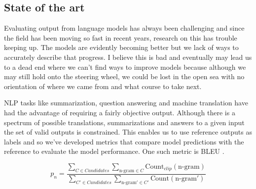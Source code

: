 \subsection{State of the art} \label{sec:body_state_of_the_art}
Evaluating output from language models has always been challenging and since the field has been moving so fast in recent years, research on this has trouble keeping up. The models are evidently becoming better but we lack of ways to accurately describe that progress. I believe this is bad and eventually may lead us to a dead end where we can't find ways to improve models because although we may still hold onto the steering wheel, we could be lost in the open sea with no orientation of where we came from and what course to take next. 

NLP tasks like summarization, question answering and machine translation have had the advantage of requiring a fairly objective output. Although there is a spectrum of possible translations, summarizations and answers to a given input the set of valid outputs is constrained. This enables us to use reference outputs as labels and so we've developed metrics that compare model predictions with the reference to evaluate the model performance. One such metric is BLEU \cite{papineni2002bleu}.  

\begin{equation}
p_n = \frac{\sum_{C \in Candidates} \sum_{\text{n-gram} \in C}\text{Count}_{clip}(\text{n-gram})}{\sum_{C' \in Candidates} \sum_{\text{n-gram}' \in C'}\text{Count}(\text{n-gram}')}
\end{equation}


